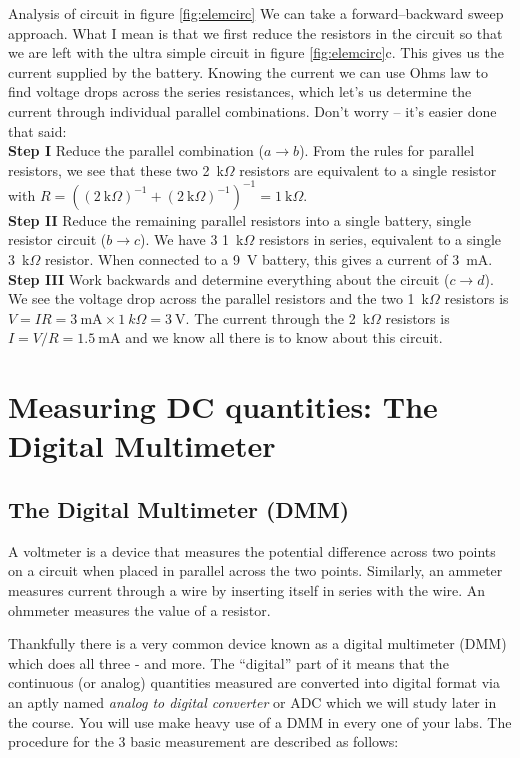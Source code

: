 \documentclass{tufte-book}
\begin{document}
\begin{myexample}[label = ex:elem_circuit_anal]{Analysis of circuit in figure \ref{fig:elemcirc}}
We can take a forward--backward sweep approach. What I mean is that we first reduce the resistors in the circuit so that we are left with the ultra simple circuit in figure \ref{fig:elemcirc}c. This gives us the current supplied by the battery. Knowing the current we can use Ohms law to find voltage drops across the series resistances, which let's us determine the current through individual parallel combinations. Don't worry -- it's easier done that said:\\
\textbf{Step I} Reduce the parallel combination ($a\rightarrow b$). From the rules for parallel resistors, we see that these two 2~k$\Omega$ resistors are equivalent to a single resistor with $R = \left((2~\text{k}\Omega)^{-1} + (2~\text{k}\Omega)^{-1} \right)^{-1} = 1~\text{k}\Omega$.\\
\textbf{Step II} Reduce the remaining parallel resistors into a single battery, single resistor circuit ($b\rightarrow c$). We have 3 1~k$\Omega$ resistors in series, equivalent to a single 3~k$\Omega$ resistor. When connected to a 9~V battery, this gives a current of 3~mA.\\
\textbf{Step III} Work backwards and determine everything about the circuit ($c\rightarrow d$). We see the voltage drop across the parallel resistors and the two 1~k$\Omega$ resistors is $V = IR = 3~\text{mA}\times1~k\Omega = 3~\text{V}$. The current through the 2~k$\Omega$ resistors is $I=V/R = 1.5~\text{mA}$ and we know all there is to know about this circuit.
\end{myexample}

\section{Measuring DC quantities: The Digital Multimeter}
\subsection*{The Digital Multimeter (DMM)}
A voltmeter is a device that measures the potential difference across two points on a circuit when placed in parallel across the two points. Similarly, an ammeter measures current through a wire by inserting itself in series with the wire. An ohmmeter measures the value of a resistor. 

Thankfully there is a very common device known as a digital multimeter (DMM) which does all three - and more. The ``digital'' part of it means that the continuous (or analog) quantities measured are converted into digital format via an aptly named \textit{analog to digital converter} or ADC which we will study later in the course. You will use make heavy use of a DMM in every one of your labs. The procedure for the 3 basic measurement are described as follows:
\end{document}
